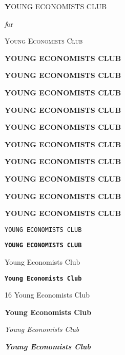 \documentclass[10pt,a4paper]{article}
\begin{document}
	\begin{center}
		
		
		\textbf YOUNG ECONOMISTS CLUB
		
		
		\textsl for %
		
		\textsc{Young Economists Club}
		
		
		{\tiny\textbf{YOUNG ECONOMISTS CLUB}}
		
		{\scriptsize\textbf{YOUNG ECONOMISTS CLUB}}
		
		{\footnotesize\textbf{YOUNG ECONOMISTS CLUB}}
		
		{\small\textbf{YOUNG ECONOMISTS CLUB}}
		
		{\normalsize\textbf{YOUNG ECONOMISTS CLUB}}
		
		{\large\textbf{YOUNG ECONOMISTS CLUB}}
		
		{\Large\textbf{YOUNG ECONOMISTS CLUB}}
		
		{\LARGE\textbf{YOUNG ECONOMISTS CLUB}}
		
		{\huge\textbf{YOUNG ECONOMISTS CLUB}}
		
		{\Huge\textbf{YOUNG ECONOMISTS CLUB}}
		
		\texttt{YOUNG ECONOMISTS CLUB}
		
		{\huge\textbf\texttt{YOUNG ECONOMISTS CLUB}}
		
		
		\textsf{Young Economists Club}
		
		{\huge\textbf\texttt{Young Economists Club}}
		
		16%
		\textrm{Young Economists Club}
		
		{\huge\textbf{\textrm{Young Economists Club}}}
		
		
		\textsl{Young Economists Club}
		
		{\huge\textbf{\textsl{Young Economists Club}}}
		
		
		
		

\end{center}
\end{document}
